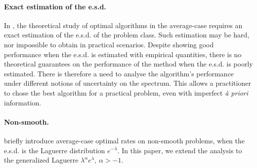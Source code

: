 \documentclass{article}
\begin{document}

\paragraph{Exact estimation of the e.s.d.} In \citep{pedregosa2020acceleration}, the theoretical study of optimal algorithms in the average-case requires an exact estimation of the e.s.d. of the problem class. Such estimation may be hard, nor impossible to obtain in practical scenarios. Despite showing good performance when the e.s.d. is estimated with empirical quantities, there is no theoretical guarantees on the performance of the method when the e.s.d. is poorly estimated. There is therefore a need to analyse the algorithm's performance under different notions of uncertainty on the spectrum. This allows a practitioner to chose the best algorithm for a practical problem, even with imperfect \textit{à priori} information. 


\paragraph{Non-smooth.} \citet{pedregosa2020acceleration} briefly introduce average-case optimal rates on non-smooth problems, when the e.s.d. is the Laguerre distribution $e^{-\lambda}$. In this paper, we extend the analysis to the generalized Laguerre $\lambda^\alpha e^{\lambda},\, \alpha >-1$.


\end{document}
